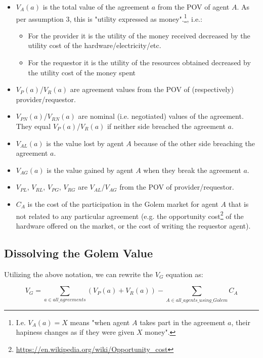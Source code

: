 \documentclass{article}
\begin{document}
\begin{itemize}
\item $V_A(a)$ is the total value of the agreement $a$ from the POV of agent $A$. As per assumption 3, this is "utility expressed as money".\footnote{
I.e. $V_A(a) = X$ means "when agent $A$ takes part in the agreement $a$, their hapiness changes as if they were given $X$ money".}, i.e.:
    \begin{itemize}
        \item For the provider it is the utility of the money received decreased by the utility cost of the hardware/electricity/etc.
        \item For the requestor it is the utility of the resources obtained decreased by the utility cost of the money spent
    \end{itemize}
\item $V_P(a)$/$V_R(a)$ are agreement values from the POV of (respectively) provider/requestor.
\item $V_{PN}(a)$/$V_{RN}(a)$ are nominal (i.e. negotiated) values of the agreement. They equal $V_P(a)$/$V_R(a)$ if neither side breached the agreement $a$.
\item $V_{AL}(a)$ is the value lost by agent $A$ because of the other side breaching the agreement $a$.
\item $V_{AG}(a)$ is the value gained by agent $A$ when they break the agreement $a$.
\item $V_{PL}$, $V_{RL}$, $V_{PG}$, $V_{RG}$ are $V_{AL}$/$V_{AG}$ from the POV of provider/requestor.
\item $C_A$ is the cost of the participation in the Golem market for agent $A$ that is not related to any particular agreement 
(e.g. the opportunity cost\footnote{\href{https://en.wikipedia.org/wiki/Opportunity\_cost}{https://en.wikipedia.org/wiki/Opportunity\_cost}} of the hardware offered on the market, 
or the cost of writing the requestor agent).
\end{itemize}

\subsection{Dissolving the Golem Value}

Utilizing the above notation, we can rewrite the $V_G$ equation as:

\begin{equation}
    V_G = \sum_{a \in all\_agreements}(V_P(a) + V_R(a)) - \sum_{A \in all\_agents\_using\_Golem}C_A
\end{equation}
\end{document}
